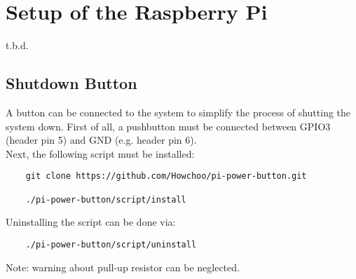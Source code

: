 \section{Setup of the Raspberry Pi}
t.b.d.

\subsection{Shutdown Button}
	

A button can be connected to the system to simplify the process of shutting the system down. First of all, a pushbutton must be connected between GPIO3 (header pin 5) and GND (e.g. header pin 6). \\

Next, the following script must be installed:

\begin{verbatim}
	git clone https://github.com/Howchoo/pi-power-button.git
	
	./pi-power-button/script/install
\end{verbatim}

Uninstalling the script can be done via:

\begin{verbatim}
	./pi-power-button/script/uninstall
\end{verbatim}

Note: warning about pull-up resistor can be neglected.

